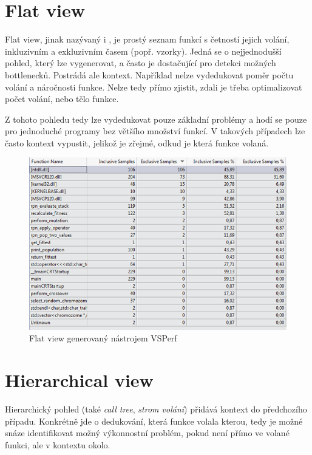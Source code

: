 \documentclass[czech,BP]{thesiskiv}
\begin{document}
\section{Flat view}

Flat view, jinak nazývaný i , je prostý seznam funkcí s četností jejich volání, inkluzivním a exkluzivním časem (popř. vzorky). Jedná se o nejjednodušší pohled, který lze vygenerovat, a často je dostačující pro detekci možných bottlenecků. Postrádá ale kontext. Například nelze vydedukovat poměr počtu volání a náročnosti funkce. Nelze tedy přímo zjistit, zdali je třeba optimalizovat počet volání, nebo tělo funkce.

Z tohoto pohledu tedy lze vydedukovat pouze základní problémy a hodí se pouze pro jednoduché programy bez většího množství funkcí. V takových případech lze často kontext vypustit, jelikož je zřejmé, odkud je která funkce volaná.

\begin{figure}[h]
    \centering
    \includegraphics[interpolate,width=1.0\textwidth]{img/prof_flatview.png}
    \caption{Flat view generovaný nástrojem VSPerf}
    \label{obr:flatview}
\end{figure}

\newpage

\section{Hierarchical view}

Hierarchický pohled (také \emph{call tree}, \emph{strom volání}) přidává kontext do předchozího případu. Konkrétně jde o dedukování, která funkce volala kterou, tedy je možné snáze identifikovat možný výkonnostní problém, pokud není přímo ve volané funkci, ale v kontextu okolo.
\end{document}
